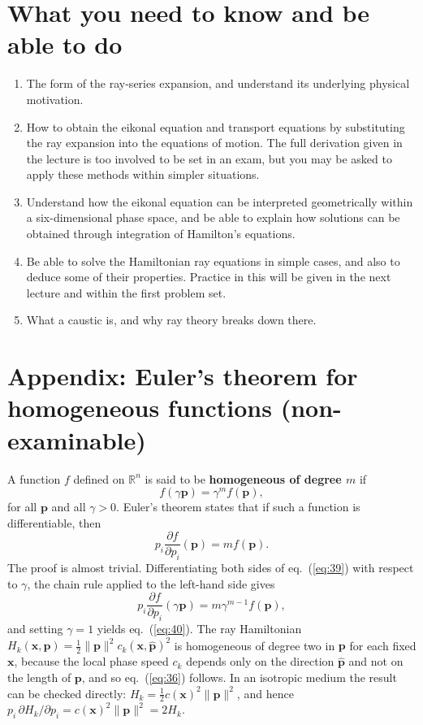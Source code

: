 \section*{What you need to know and be able to do}
\begin{enumerate}
    \item[(i)] The form of the ray-series expansion, and understand its underlying physical motivation.
    \item[(ii)] How to obtain the eikonal equation and transport equations by substituting the ray expansion into the equations of motion. The full derivation given in the lecture is too involved to be set in an exam, but you may be asked to apply these methods within simpler situations.
    \item[(iii)] Understand how the eikonal equation can be interpreted geometrically within a six-dimensional phase space, and be able to explain how solutions can be obtained through integration of Hamilton's equations.
    \item[(iv)] Be able to solve the Hamiltonian ray equations in simple cases, and also to deduce some of their properties. Practice in this will be given in the next lecture and within the first problem set.
    \item[(v)] What a caustic is, and why ray theory breaks down there.
\end{enumerate}

\appendix
\section*{Appendix: Euler's theorem for homogeneous functions (non-examinable)}
A function $f$ defined on $\mathbb{R}^{n}$ is said to be \textbf{homogeneous of degree $m$} if
\begin{equation}
f(\gamma\mathbf{p})=\gamma^{m}f(\mathbf{p}),
\label{eq:39}
\end{equation}
for all $\mathbf{p}$ and all $\gamma>0$. Euler's theorem states that if such a function is differentiable, then
\begin{equation}
p_{i}\frac{\partial f}{\partial p_{i}}(\mathbf{p})=mf(\mathbf{p}).
\label{eq:40}
\end{equation}
The proof is almost trivial. Differentiating both sides of eq.~(\ref{eq:39}) with respect to $\gamma$, the chain rule applied to the left-hand side gives
\begin{equation}
p_{i}\frac{\partial f}{\partial p_{i}}(\gamma\mathbf{p})=m\gamma^{m-1}f(\mathbf{p}),
\label{eq:41}
\end{equation}
and setting $\gamma=1$ yields eq.~(\ref{eq:40}). The ray Hamiltonian $H_{k}(\mathbf{x},\mathbf{p})=\frac{1}{2}\|\mathbf{p}\|^{2}c_{k}(\mathbf{x},\hat{\mathbf{p}})^{2}$ 
is homogeneous of degree two in $\mathbf{p}$ for each fixed $\mathbf{x}$, because the local phase speed $c_{k}$ depends only on the 
direction $\hat{\mathbf{p}}$ and not on the length of $\mathbf{p}$, and so eq.~(\ref{eq:36}) follows. In an isotropic medium the result can be checked directly: 
$H_{k}=\frac{1}{2}c(\mathbf{x})^{2}\|\mathbf{p}\|^{2}$, and hence $p_{i}\,\partial H_{k}/\partial p_{i}=c(\mathbf{x})^{2}\|\mathbf{p}\|^{2}=2H_{k}$.
